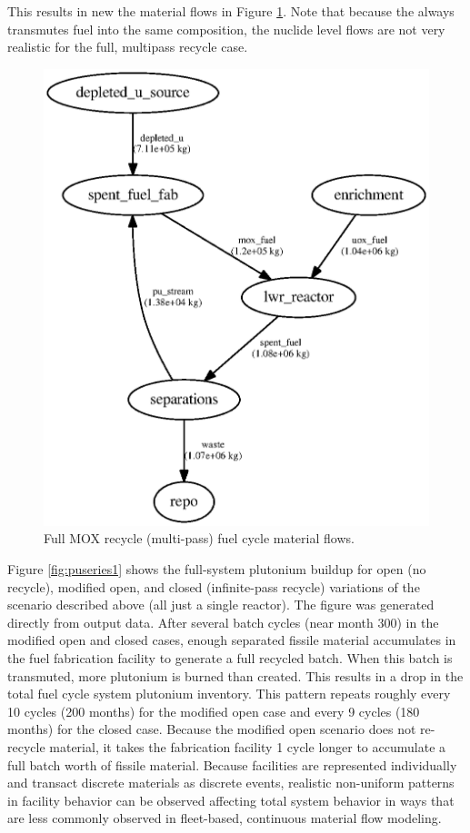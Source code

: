 This results in new the material flows in Figure \ref{fig:flowclosed}. Note
that because the  always transmutes fuel into the same
composition, the nuclide level flows are not very realistic for the full, multipass
recycle case.

\begin{figure}[H]
\label{fig:flowclosed}
\caption{Full MOX recycle (multi-pass) fuel cycle material flows.}
\begin{center}
\includegraphics{./images/flow-closed-1.eps}
\end{center}
\end{figure}

Figure \ref{fig:puseries1} shows the full-system plutonium buildup for open
(no recycle), modified open, and closed (infinite-pass recycle) variations of
the scenario described above (all just a single reactor).  The figure was
generated directly from \Cyclus output data. After several batch cycles (near
month 300) in the modified open and closed cases, enough separated fissile
material accumulates in the fuel fabrication facility to generate a full
recycled batch.  When this batch is transmuted, more plutonium is burned than
created.  This results in a drop in the total fuel cycle system plutonium
inventory.  This pattern repeats roughly every 10 cycles (200 months) for the
modified open case and every 9 cycles (180 months) for the closed case.
Because the modified open scenario does not re-recycle material, it takes the
fabrication facility 1 cycle longer to accumulate a full batch worth of
fissile material.  Because facilities are represented individually and
transact discrete materials as discrete events, realistic non-uniform patterns
in facility behavior can be observed affecting total system behavior in ways
that are less commonly observed in fleet-based, continuous material flow
modeling.

